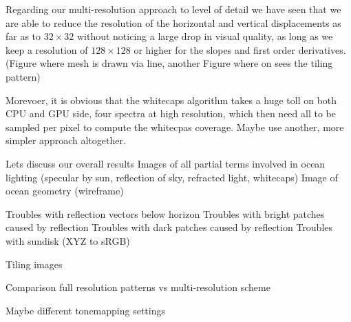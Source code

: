 Regarding our multi-resolution approach to level of detail we have seen that we are able to reduce the resolution of the horizontal
and vertical displacements as far as to $32\times32$ without
noticing a large drop in visual quality, as long as we keep a
resolution of $128\times128$ or higher for the slopes and first
order derivatives. (Figure where mesh is drawn via line, another
Figure where on sees the tiling pattern)

Morevoer, it is obvious that the whitecaps algorithm takes a huge
toll on both CPU and GPU side, four spectra at high resolution,
which then need all to be sampled per pixel to compute the
whitecpas coverage. Maybe use another, more simpler approach altogether.

Lets discuss our overall results
Images of all partial terms involved in ocean lighting (specular by sun,
reflection of sky, refracted light, whitecaps)
Image of ocean geometry (wireframe)

Troubles with reflection vectors below horizon
Troubles with bright patches caused by reflection
Troubles with dark patches caused by reflection
Troubles with sundisk (XYZ to sRGB)

Tiling images

Comparison full resolution patterns vs multi-resolution scheme

Maybe different tonemapping settings